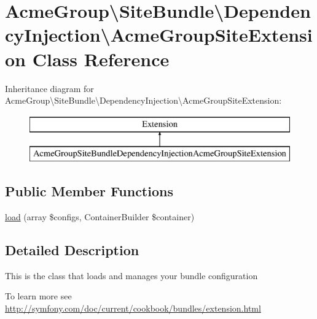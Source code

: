 \hypertarget{class_acme_group_1_1_site_bundle_1_1_dependency_injection_1_1_acme_group_site_extension}{\section{Acme\+Group\textbackslash{}Site\+Bundle\textbackslash{}Dependency\+Injection\textbackslash{}Acme\+Group\+Site\+Extension Class Reference}
\label{class_acme_group_1_1_site_bundle_1_1_dependency_injection_1_1_acme_group_site_extension}
}
Inheritance diagram for Acme\+Group\textbackslash{}Site\+Bundle\textbackslash{}Dependency\+Injection\textbackslash{}Acme\+Group\+Site\+Extension\+:\begin{figure}[H]
\begin{center}
\leavevmode
\includegraphics[height=2.000000cm]{class_acme_group_1_1_site_bundle_1_1_dependency_injection_1_1_acme_group_site_extension}
\end{center}
\end{figure}
\subsection*{Public Member Functions}
\begin{DoxyCompactItemize}
\item 
\hyperlink{class_acme_group_1_1_site_bundle_1_1_dependency_injection_1_1_acme_group_site_extension_a787f8ccde7e2dcb47dc3be542e7ca8f1}{load} (array \$configs, Container\+Builder \$container)
\end{DoxyCompactItemize}


\subsection{Detailed Description}
This is the class that loads and manages your bundle configuration

To learn more see \hyperlink{}{http\+://symfony.\+com/doc/current/cookbook/bundles/extension.\+html} 

